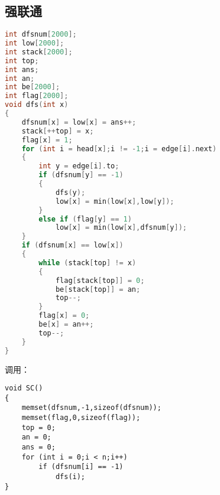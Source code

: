 \subsection{强联通}
	\begin{lstlisting}[language=c++]
int dfsnum[2000];
int low[2000];
int stack[2000];
int top;
int ans;
int an;
int be[2000];
int flag[2000];
void dfs(int x)
{
	dfsnum[x] = low[x] = ans++;
	stack[++top] = x;
	flag[x] = 1;
	for (int i = head[x];i != -1;i = edge[i].next)
	{
		int y = edge[i].to;
		if (dfsnum[y] == -1)
		{
			dfs(y);
			low[x] = min(low[x],low[y]);
		}
		else if (flag[y] == 1)
			low[x] = min(low[x],dfsnum[y]);
	}
	if (dfsnum[x] == low[x])
	{
		while (stack[top] != x)
		{
			flag[stack[top]] = 0;
			be[stack[top]] = an;
			top--;
		}
		flag[x] = 0;
		be[x] = an++;
		top--;
	}
}
	\end{lstlisting}
	调用：\\
	\begin{lstlisting}
void SC()
{
	memset(dfsnum,-1,sizeof(dfsnum));
	memset(flag,0,sizeof(flag));
	top = 0;
	an = 0;
	ans = 0;
	for (int i = 0;i < n;i++)
		if (dfsnum[i] == -1)
			dfs(i);
}
	\end{lstlisting}